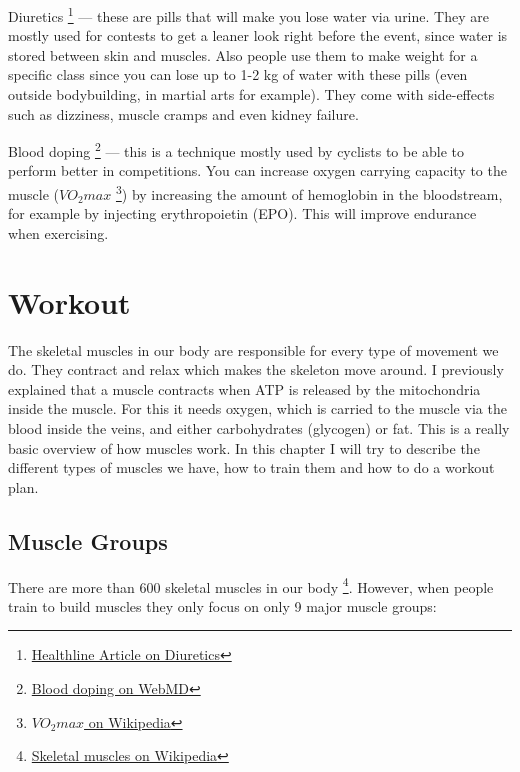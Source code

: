 \documentclass[openany, 12pt]{book}
\begin{document}
        Diuretics
        \footnote{\href{https://www.healthline.com/health/diuretics}{Healthline Article on Diuretics}}
        --- these are pills that will make you lose water via urine. They are mostly used for contests to get a leaner look right before the event, since water is stored between skin and muscles. Also
        people use them to make weight for a specific class since you can lose up to 1-2 kg of water with these pills (even outside bodybuilding, in martial arts for example). They come with side-effects
        such as dizziness, muscle cramps and even kidney failure.

        Blood doping
        \footnote{\href{https://www.webmd.com/fitness-exercise/blood-doping}{Blood doping on WebMD}}
        --- this is a technique mostly used by cyclists to be able to perform better in competitions. You can increase oxygen carrying capacity to the muscle ($VO_2max$
        \footnote{\href{https://en.wikipedia.org/wiki/VO2_max}{$VO_2max$ on Wikipedia}}) by increasing the amount of
        hemoglobin in the bloodstream, for example by injecting erythropoietin (EPO). This will improve endurance when exercising.

  \chapter{Workout}

        The skeletal muscles in our body are responsible for every type of movement we do. They contract and relax which makes the skeleton move around. I previously explained that
        a muscle contracts when ATP is released by the mitochondria inside the muscle. For this it needs oxygen, which is carried to the muscle via the blood inside the veins, and
        either carbohydrates (glycogen) or fat. This is a really basic overview of how muscles work. In this chapter I will try to describe the different types of muscles we have,
        how to train them and how to do a workout plan.
  
        \section{Muscle Groups}

        There are more than 600 skeletal muscles in our body
        \footnote{\href{https://en.wikipedia.org/wiki/Skeletal_muscle}{Skeletal muscles on Wikipedia}}. However, when people train to build muscles they only
        focus on only 9 major muscle groups:
\end{document}
